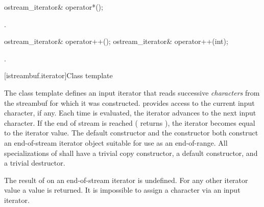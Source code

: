 %
\begin{itemdecl}
ostream_iterator& operator*();
\end{itemdecl}

\begin{itemdescr}
\pnum
\returns
{}.
\end{itemdescr}

%
\begin{itemdecl}
ostream_iterator& operator++();
ostream_iterator& operator++(int);
\end{itemdecl}

\begin{itemdescr}
\pnum
\returns
{}.
\end{itemdescr}

[istreambuf.iterator]{Class template }

\pnum
The
class template
defines an input iterator that
reads successive
\textit{characters}
from the streambuf for which it was constructed.
provides access to the current input character, if any.
Each time
is evaluated, the iterator advances to the next input character.
If the end of stream is reached ( returns
),
the iterator becomes equal to the
iterator value.
The default constructor
and the constructor
both construct an end-of-stream iterator object suitable for use
as an end-of-range.
All specializations of  shall have a trivial copy
constructor, a  default constructor, and a trivial destructor.

\pnum
The result of
on an end-of-stream iterator is undefined.
%
For any other iterator value a
value is returned.
It is impossible to assign a character via an input iterator.


